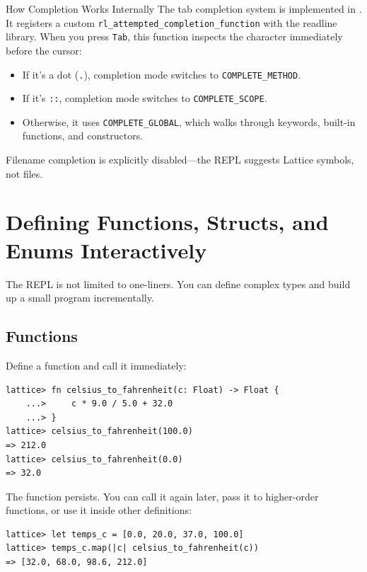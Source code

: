 \begin{notebox}{How Completion Works Internally}
The tab completion system is implemented in .
It registers a custom \lstinline|rl_attempted_completion_function| with the readline library.
When you press \texttt{Tab}, this function inspects the character immediately before the cursor:
\begin{itemize}
  \item If it's a dot (\lstinline|.|), completion mode switches to \texttt{COMPLETE\_METHOD}.
  \item If it's \lstinline|::|, completion mode switches to \texttt{COMPLETE\_SCOPE}.
  \item Otherwise, it uses \texttt{COMPLETE\_GLOBAL}, which walks through keywords, built-in functions, and constructors.
\end{itemize}
Filename completion is explicitly disabled---the REPL suggests Lattice symbols, not files.
\end{notebox}

\section{Defining Functions, Structs, and Enums Interactively}\label{sec:defining-interactively}

The REPL is not limited to one-liners.
You can define complex types and build up a small program incrementally.

\subsection{Functions}\label{subsec:repl-functions}

Define a function and call it immediately:

\begin{lstlisting}[language=Lattice, numbers=none]
lattice> fn celsius_to_fahrenheit(c: Float) -> Float {
    ...>     c * 9.0 / 5.0 + 32.0
    ...> }
lattice> celsius_to_fahrenheit(100.0)
=> 212.0
lattice> celsius_to_fahrenheit(0.0)
=> 32.0
\end{lstlisting}

The function persists.
You can call it again later, pass it to higher-order functions, or use it inside other definitions:

\begin{lstlisting}[language=Lattice, numbers=none]
lattice> let temps_c = [0.0, 20.0, 37.0, 100.0]
lattice> temps_c.map(|c| celsius_to_fahrenheit(c))
=> [32.0, 68.0, 98.6, 212.0]
\end{lstlisting}

